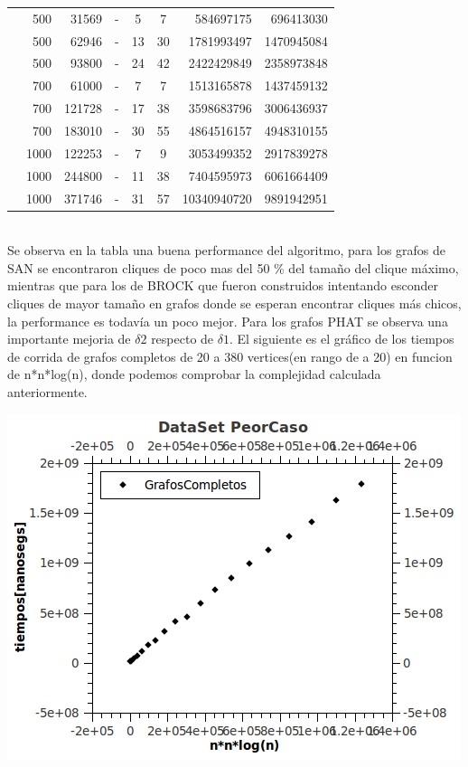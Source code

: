 \begin{tabular}{|l|r|r|c|c|c|r|r|}
& 500& 31569& -& 5& 7&584697175 & 696413030\\
& 500& 62946& -& 13& 30&1781993497 & 1470945084\\
& 500& 93800& -& 24& 42&2422429849 &2358973848 \\
& 700& 61000& -& 7& 7&1513165878 & 1437459132\\
& 700& 121728& -& 17& 38&3598683796 & 3006436937\\
& 700& 183010& -& 30& 55&4864516157 & 4948310155 \\ 
& 1000& 122253& -& 7& 9&3053499352 & 2917839278\\
& 1000& 244800& -& 11& 38&7404595973 & 6061664409\\
& 1000& 371746& -& 31& 57&10340940720 & 9891942951\\
\hline 
\end{tabular} \\

Se observa en la tabla una buena performance del algoritmo, para los grafos de SAN se encontraron cliques de poco mas del 50 \% del tamaño del clique máximo, mientras que para los de BROCK que fueron construidos intentando esconder cliques de mayor tamaño en grafos donde se esperan encontrar cliques más chicos, la performance es todavía un poco mejor. 
Para los grafos PHAT se observa una importante mejoria de $\delta2$ respecto de $\delta1$. 
El siguiente es el gráfico de los tiempos de corrida de grafos completos de 20 a 380 vertices(en rango de a 20) en funcion de n*n*log(n), donde podemos comprobar la complejidad calculada anteriormente.
 
\includegraphics[scale=0.8]{HC/PeorCaso.png}

